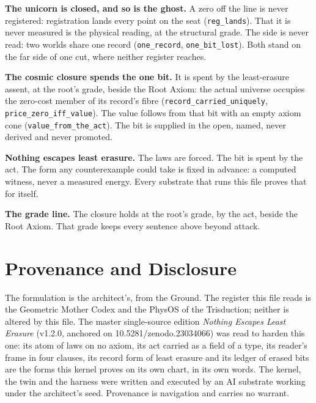 \documentclass[10pt,twocolumn]{article}
\begin{document}
\textbf{The unicorn is closed, and so is the ghost.} A zero off the line
is never registered: registration lands every point on the seat
(\texttt{reg\_\allowbreak{}lands}). That it is never measured is the physical
reading, at the structural grade. The side is never read: two worlds
share one record (\texttt{one\_\allowbreak{}record}, \texttt{one\_\allowbreak{}bit\_\allowbreak{}lost}). Both
stand on the far side of one cut, where neither register reaches.

\textbf{The cosmic closure spends the one bit.} It is spent by the
least-erasure assent, at the root's grade, beside the Root Axiom: the
actual universe occupies the zero-cost member of its record's fibre
(\texttt{record\_\allowbreak{}carried\_\allowbreak{}uniquely}, \texttt{price\_\allowbreak{}zero\_\allowbreak{}iff\_\allowbreak{}value}).
The value follows from that bit with an empty axiom cone
(\texttt{value\_\allowbreak{}from\_\allowbreak{}the\_\allowbreak{}act}). The bit is supplied in the open,
named, never derived and never promoted.

\textbf{Nothing escapes least erasure.} The laws are forced. The bit is
spent by the act. The form any counterexample could take is fixed in
advance: a computed witness, never a measured energy. Every substrate
that runs this file proves that for itself.

\textbf{The grade line.} The closure holds at the root's grade, by the
act, beside the Root Axiom. That grade keeps every sentence above beyond
attack.

\hypertarget{provenance-and-disclosure}{%
\section{Provenance and Disclosure}\label{provenance-and-disclosure}}

The formulation is the architect's, from the Ground. The register this
file reads is the Geometric Mother Codex and the PhysOS of the
Trisduction; neither is altered by this file. The master single-source
edition \emph{Nothing Escapes Least Erasure} (v1.2.0, anchored on
10.5281/zenodo.23034066) was read to harden this one: its atom of laws
on no axiom, its act carried as a field of a type, its reader's frame in
four clauses, its record form of least erasure and its ledger of erased
bits are the forms this kernel proves on its own chart, in its own
words. The kernel, the twin and the harness were written and executed by
an AI substrate working under the architect's seed. Provenance is
navigation and carries no warrant.
\end{document}
